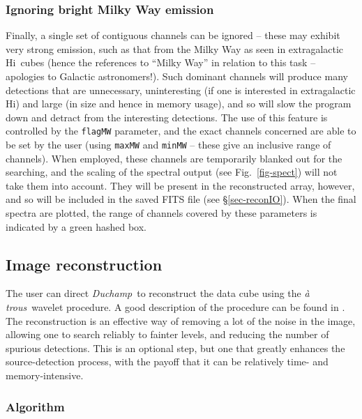 \documentclass[12pt,a4paper]{article}
\newcommand{\hi}{H{\sc i}}
\newcommand{\duchamp}{\emph{Duchamp}}
\newcommand{\atrous}{\textit{{\`a} trous}}
\begin{document}
\subsubsection{Ignoring bright Milky Way emission}

Finally, a single set of contiguous channels can be ignored -- these
may exhibit very strong emission, such as that from the Milky Way as
seen in extragalactic \hi\ cubes (hence the references to ``Milky
Way'' in relation to this task -- apologies to Galactic
astronomers!). Such dominant channels will produce many detections
that are unnecessary, uninteresting (if one is interested in
extragalactic \hi) and large (in size and hence in memory usage), and
so will slow the program down and detract from the interesting
detections. The use of this feature is controlled by the
\texttt{flagMW} parameter, and the exact channels concerned are able
to be set by the user (using \texttt{maxMW} and \texttt{minMW} --
these give an inclusive range of channels). When employed, these
channels are temporarily blanked out for the searching, and the
scaling of the spectral output (see Fig.~\ref{fig-spect}) will not
take them into account. They will be present in the reconstructed
array, however, and so will be included in the saved FITS file (see
\S\ref{sec-reconIO}). When the final spectra are plotted, the range of
channels covered by these parameters is indicated by a green hashed
box.

\subsection{Image reconstruction}
\label{sec-recon}

The user can direct \duchamp\ to reconstruct the data cube using the
\atrous\ wavelet procedure. A good description of the procedure can be
found in \citet{starck02:book}. The reconstruction is an effective way
of removing a lot of the noise in the image, allowing one to search
reliably to fainter levels, and reducing the number of spurious
detections. This is an optional step, but one that greatly enhances
the source-detection process, with the payoff that it can be
relatively time- and memory-intensive.

\subsubsection{Algorithm}
\end{document}
